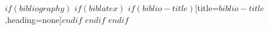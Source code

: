 $if(bibliography)$
$if(biblatex)$
\printbibliography$if(biblio-title)$[title=$biblio-title$,heading=none]$endif$
$endif$
$endif$